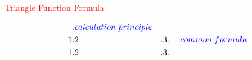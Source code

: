 \documentclass{standalone}
\begin{document}
\begin{minipage}[b][14cm][t]{1.00\textwidth}
\begin{center}\textcolor{red}{\huge{Triangle Function Formula}}\end{center}
\begin{Large}\begin{align*}
&.\textcolor{blue}{calculation\hspace{3pt}principle}\\
1&.
2&.
3&.
&.\textcolor{blue}{common\hspace{3pt}formula}\\
1&.
2&.
3&.
\end{align*}\end{Large}
\end{minipage}
\end{document}
